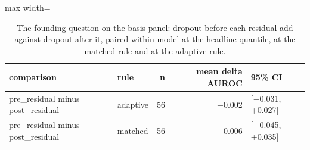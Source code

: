 \begin{table}[htbp]
\centering
\small
\caption{The founding question on the basis panel: dropout before each residual add against dropout after it, paired within model at the headline quantile, at the matched rule and at the adaptive rule.}
\label{tab:pre-post}
\begin{adjustbox}{max width=\linewidth}
\begin{tabular}{llrrl}
\toprule
comparison & rule & n & mean delta AUROC & 95\% CI \\
\midrule
pre\_residual minus post\_residual & adaptive & 56 & $-$0.002 & [$-$0.031, +0.027] \\
pre\_residual minus post\_residual & matched & 56 & $-$0.006 & [$-$0.045, +0.035] \\
\bottomrule
\end{tabular}
\end{adjustbox}
\end{table}
